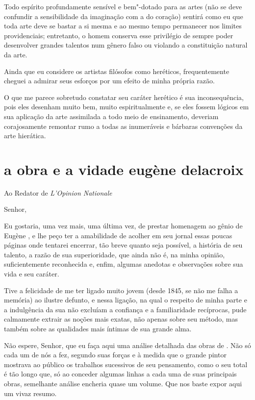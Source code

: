 Todo espírito profundamente sensível e bem"-dotado para as artes (não se
deve confundir a sensibilidade da imaginação com a do coração) sentirá
como eu que toda arte deve se bastar a si mesma e ao mesmo tempo
permanecer nos limites providenciais; entretanto, o homem conserva esse
privilégio de sempre poder desenvolver grandes talentos num gênero
falso ou violando a constituição natural da arte.

Ainda que eu considere os artistas filósofos como heréticos,
frequentemente cheguei a admirar seus esforços por um efeito de minha
própria razão.

O que me parece sobretudo constatar seu caráter herético é sua
inconsequência, pois eles desenham muito bem, muito espiritualmente e,
se eles fossem lógicos em sua aplicação da arte assimilada a todo meio
de ensinamento, deveriam corajosamente remontar rumo a todas as
inumeráveis e bárbaras convenções da arte hierática.

\chapter[A obra e a vida de Eugène Delacroix]{a obra e a vida\break de eugène delacroix}

Ao Redator de \textit{L'Opinion Nationale}

\vspace{1em}
Senhor,

Eu gostaria, uma vez mais, uma última vez, de prestar homenagem ao gênio
de Eugène , e lhe peço ter a amabilidade de acolher em seu
jornal essas poucas páginas onde tentarei encerrar, tão breve quanto
seja possível, a história de seu talento, a razão de sua superioridade,
que ainda não é, na minha opinião, suficientemente reconhecida e,
enfim, algumas anedotas e observações sobre sua vida e seu caráter.

Tive a felicidade de me ter ligado muito jovem (desde 1845, se não me
falha a memória) ao ilustre defunto, e nessa ligação, na qual o
respeito de minha parte e a indulgência da sua não excluíam a confiança
e a familiaridade recíprocas, pude calmamente extrair as noções mais
exatas, não apenas sobre seu método, mas também sobre as qualidades
mais íntimas de sua grande alma.

Não espere, Senhor, que eu faça aqui uma análise detalhada das obras de
. Não só cada um de nós a fez, segundo suas forças e à medida
que o grande pintor mostrava ao público os trabalhos sucessivos de seu
pensamento, como o seu total é tão longo que, só ao conceder algumas
linhas a cada uma de suas principais obras, semelhante análise encheria
quase um volume. Que nos baste expor aqui um vivaz resumo.


